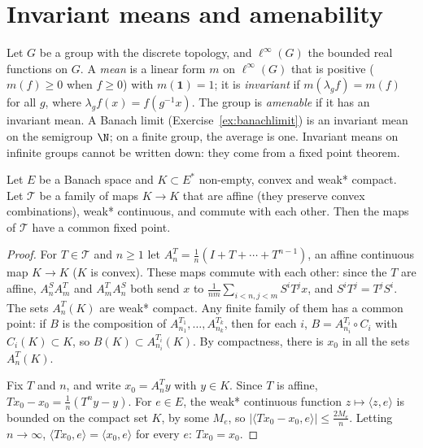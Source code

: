 \section{Invariant means and amenability}

Let $G$ be a group with the discrete topology, and $\ell^\infty(G)$ the bounded real functions on $G$. A \emph{mean} is a linear form $m$ on $\ell^\infty(G)$ that is
positive ($m(f)\ge0$ when $f\ge0$) with $m(\mathbf 1)=1$; it is \emph{invariant} if $m(\lambda_gf)=m(f)$ for all $g$, where $\lambda_gf(x)=f(g^{-1}x)$. The group is
\emph{amenable} if it has an invariant mean. A Banach limit (Exercise~\ref{ex:banachlimit}) is an invariant mean on the semigroup $\N$; on a finite group, the average
is one. Invariant means on infinite groups cannot be written down: they come from a fixed point theorem.

\begin{theorem}\label{thm:markovkakutani}
Let $E$ be a Banach space and $K\subset E^*$ non-empty, convex and weak* compact. Let $\mathcal T$ be a family of maps $K\to K$ that are affine (they preserve
convex combinations), weak* continuous, and commute with each other. Then the maps of $\mathcal T$ have a common fixed point.
\end{theorem}
\begin{proof}
For $T\in\mathcal T$ and $n\ge1$ let $A^T_n=\frac1n(I+T+\cdots+T^{n-1})$, an affine continuous map $K\to K$ ($K$ is convex). These maps commute with each other: since the $T$
are affine, $A^S_nA^T_m$ and $A^T_mA^S_n$ both send $x$ to $\frac1{nm}\sum_{i<n,j<m}S^iT^jx$, and $S^iT^j=T^jS^i$. The sets $A^T_n(K)$ are weak* compact. Any finite
family of them has a common point: if $B$ is the composition of $A^{T_1}_{n_1},\dots,A^{T_k}_{n_k}$, then for each $i$, $B=A^{T_i}_{n_i}\circ C_i$ with $C_i(K)\subset K$, so
$B(K)\subset A^{T_i}_{n_i}(K)$. By compactness, there is $x_0$ in all the sets $A^T_n(K)$.

Fix $T$ and $n$, and write $x_0=A^T_ny$ with $y\in K$. Since $T$ is affine, $Tx_0-x_0=\frac1n(T^ny-y)$. For $e\in E$, the weak* continuous function $z\mapsto\langle z,e\rangle$ is
bounded on the compact set $K$, by some $M_e$, so $|\langle Tx_0-x_0,e\rangle|\le\frac{2M_e}n$. Letting $n\to\infty$, $\langle Tx_0,e\rangle=\langle x_0,e\rangle$ for every $e$: $Tx_0=x_0$.
\end{proof}

